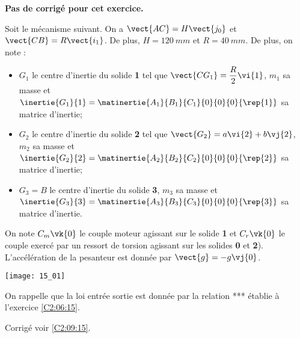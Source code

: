 \normalfalse \difficiletrue \tdifficilefalse
\correctionfalse


\setcounter{numques}{0}
\ifcorrection
\else
\textbf{Pas de corrigé pour cet exercice.}
\fi

\ifprof
\else

Soit le mécanisme suivant. On a $\vect{AC}=H\vect{j_0}$ et $\vect{CB}=R\vect{i_1}$. De plus, 
$H=\SI{120}{mm}$ et $R=\SI{40}{mm}$.  De plus, on note :
\begin{itemize}
\item $G_1$ le centre d'inertie du solide \textbf{1} tel que $\vect{CG_1}=\dfrac{R}{2} \vi{1}$, $m_1$ sa masse et $\inertie{G_1}{1}=\matinertie{A_1}{B_1}{C_1}{0}{0}{0}{\rep{1}}$ sa matrice d'inertie;
\item $G_2$ le centre d'inertie du solide \textbf{2} tel que $\vect{G_2}=a \vi{2}+b\vj{2}$, $m_2$ sa masse et $\inertie{G_2}{2}=\matinertie{A_2}{B_2}{C_2}{0}{0}{0}{\rep{2}}$ sa matrice d'inertie;
\item $G_3=B$ le centre d'inertie du solide \textbf{3}, $m_3$ sa masse et $\inertie{G_3}{3}=\matinertie{A_3}{B_3}{C_3}{0}{0}{0}{\rep{3}}$ sa matrice d'inertie.
\end{itemize}
On note $C_m\vk{0}$ le couple moteur agissant sur le solide \textbf{1} et $C_r\vk{0}$ le couple exercé par un ressort de torsion agissant sur les solides \textbf{0} et \textbf{2}). L'accélération de la pesanteur est donnée par $\vect{g}=-g\vj{0}$.


\begin{center}
\texttt{[image: 15\_01]}
\end{center}
\fi

On rappelle que la loi entrée sortie est donnée par la relation *** établie à l'exercice \ref{C2:06:15}.

\ifprof
\else
\fi

\ifprof
\else
\fi

\ifprof
\else
\fi

\ifprof
\else
\fi

\ifprof
\else
\fi

\ifprof
\else
\begin{flushright}
\footnotesize{Corrigé  voir \ref{C2:09:15}.}
\end{flushright}%
\fi